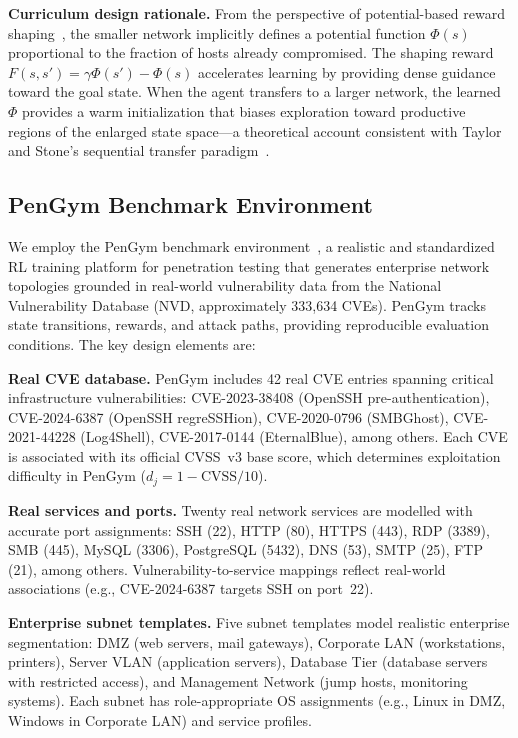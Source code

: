 \documentclass[conference]{IEEEtran}
\begin{document}
\textbf{Curriculum design rationale.}  From the perspective of
potential-based reward shaping~\cite{ng1999potential}, the smaller
network implicitly defines a potential function $\Phi(s)$ proportional
to the fraction of hosts already compromised.  The shaping reward
$F(s, s') = \gamma\Phi(s') - \Phi(s)$ accelerates learning by
providing dense guidance toward the goal state.  When the agent
transfers to a larger network, the learned $\Phi$ provides a warm
initialization that biases exploration toward productive regions of
the enlarged state space---a theoretical account consistent with
Taylor and Stone's sequential transfer paradigm~\cite{taylor2009transfer}.

\subsection{PenGym Benchmark Environment}
\label{sec:envvalidation}

We employ the PenGym benchmark environment~\cite{nguyen2025cose}, a realistic and standardized RL training platform for penetration testing that generates enterprise network topologies grounded in real-world vulnerability data from the National Vulnerability Database (NVD, approximately 333,634 CVEs).  PenGym tracks state transitions, rewards, and attack paths, providing reproducible evaluation conditions.  The key design elements are:

\textbf{Real CVE database.}  PenGym includes 42 real CVE
entries spanning critical infrastructure vulnerabilities:
CVE-2023-38408 (OpenSSH pre-authentication), CVE-2024-6387 (OpenSSH
regreSSHion), CVE-2020-0796 (SMBGhost), CVE-2021-44228 (Log4Shell),
CVE-2017-0144 (EternalBlue), among others.  Each CVE is associated
with its official CVSS~v3 base score, which determines exploitation
difficulty in PenGym ($d_j = 1 - \text{CVSS}/10$).

\textbf{Real services and ports.}  Twenty real network services are
modelled with accurate port assignments: SSH (22), HTTP (80),
HTTPS (443), RDP (3389), SMB (445), MySQL (3306), PostgreSQL (5432),
DNS (53), SMTP (25), FTP (21), among others.  Vulnerability-to-service
mappings reflect real-world associations (e.g., CVE-2024-6387 targets
SSH on port~22).

\textbf{Enterprise subnet templates.}  Five subnet templates model
realistic enterprise segmentation: DMZ (web servers, mail gateways),
Corporate LAN (workstations, printers), Server VLAN (application
servers), Database Tier (database servers with restricted access),
and Management Network (jump hosts, monitoring systems).  Each
subnet has role-appropriate OS assignments (e.g., Linux in DMZ,
Windows in Corporate LAN) and service profiles.
\end{document}
